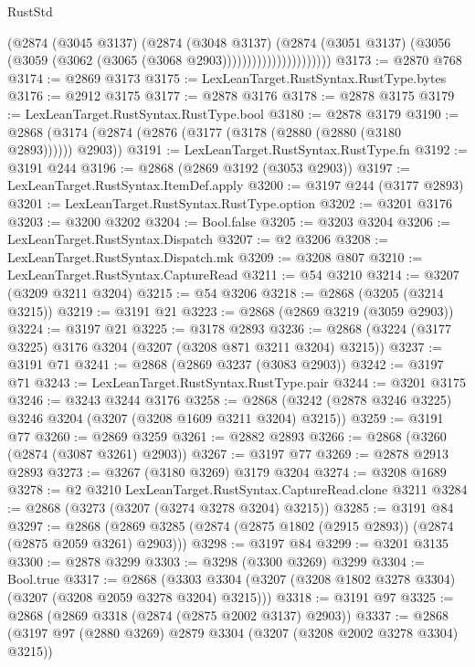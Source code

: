 \begin{lexlean}{RustStd}
\begin{coremodule}
{{{{{{{{{{{{{{{{{{{                                (@2874
                                  (@3045 @3137)
                                  (@2874
                                    (@3048 @3137)
                                    (@2874
                                      (@3051 @3137)
                                      (@3056 (@3059 (@3062 (@3065 (@3068 @2903))))))))))))))))))))))
@3173 := @2870 @768
@3174 := @2869 @3173
@3175 := LexLeanTarget.RustSyntax.RustType.bytes
@3176 := @2912 @3175
@3177 := @2878 @3176
@3178 := @2878 @3175
@3179 := LexLeanTarget.RustSyntax.RustType.bool
@3180 := @2878 @3179
@3190 := @2868 (@3174 (@2874 (@2876 (@3177 (@3178 (@2880 (@2880 (@3180 @2893)))))) @2903))
@3191 := LexLeanTarget.RustSyntax.RustType.fn
@3192 := @3191 @244
@3196 := @2868 (@2869 @3192 (@3053 @2903))
@3197 := LexLeanTarget.RustSyntax.ItemDef.apply
@3200 := @3197 @244 (@3177 @2893)
@3201 := LexLeanTarget.RustSyntax.RustType.option
@3202 := @3201 @3176
@3203 := @3200 @3202
@3204 := Bool.false
@3205 := @3203 @3204
@3206 := LexLeanTarget.RustSyntax.Dispatch
@3207 := @2 @3206
@3208 := LexLeanTarget.RustSyntax.Dispatch.mk
@3209 := @3208 @807
@3210 := LexLeanTarget.RustSyntax.CaptureRead
@3211 := @54 @3210
@3214 := @3207 (@3209 @3211 @3204)
@3215 := @54 @3206
@3218 := @2868 (@3205 (@3214 @3215))
@3219 := @3191 @21
@3223 := @2868 (@2869 @3219 (@3059 @2903))
@3224 := @3197 @21
@3225 := @3178 @2893
@3236 := @2868 (@3224 (@3177 @3225) @3176 @3204 (@3207 (@3208 @871 @3211 @3204) @3215))
@3237 := @3191 @71
@3241 := @2868 (@2869 @3237 (@3083 @2903))
@3242 := @3197 @71
@3243 := LexLeanTarget.RustSyntax.RustType.pair
@3244 := @3201 @3175
@3246 := @3243 @3244 @3176
@3258 := @2868 (@3242 (@2878 @3246 @3225) @3246 @3204 (@3207 (@3208 @1609 @3211 @3204) @3215))
@3259 := @3191 @77
@3260 := @2869 @3259
@3261 := @2882 @2893
@3266 := @2868 (@3260 (@2874 (@3087 @3261) @2903))
@3267 := @3197 @77
@3269 := @2878 @2913 @2893
@3273 := @3267 (@3180 @3269) @3179 @3204
@3274 := @3208 @1689
@3278 := @2 @3210 LexLeanTarget.RustSyntax.CaptureRead.clone @3211
@3284 := @2868 (@3273 (@3207 (@3274 @3278 @3204) @3215))
@3285 := @3191 @84
@3297 := @2868 (@2869 @3285 (@2874 (@2875 @1802 (@2915 @2893)) (@2874 (@2875 @2059 @3261) @2903)))
@3298 := @3197 @84
@3299 := @3201 @3135
@3300 := @2878 @3299
@3303 := @3298 (@3300 @3269) @3299
@3304 := Bool.true
@3317 := @2868
    (@3303 @3304 (@3207 (@3208 @1802 @3278 @3304) (@3207 (@3208 @2059 @3278 @3204) @3215)))
@3318 := @3191 @97
@3325 := @2868 (@2869 @3318 (@2874 (@2875 @2002 @3137) @2903))
@3337 := @2868 (@3197 @97 (@2880 @3269) @2879 @3304 (@3207 (@3208 @2002 @3278 @3304) @3215))
}}}}}}}}}}}}}}}}}}}
\end{coremodule}
\end{lexlean}
